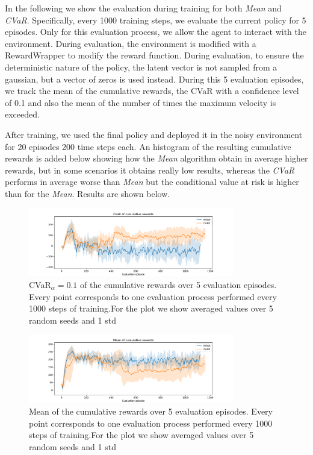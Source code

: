 In the following we show the evaluation during training for both \textit{Mean} and
\textit{CVaR}.
Specifically, every 1000 training steps, we evaluate the current policy for 5 episodes.
Only for this evaluation process, we allow the agent to interact with the environment.
During evaluation, the environment is modified with a RewardWrapper to modify
the reward function.
During evaluation, to ensure the deterministic nature of the policy, 
the latent vector is not sampled from a gaussian, but a vector of zeros is used instead.
During this 5 evaluation episodes, we track the mean of the cumulative rewards,
the CVaR with a confidence level of 0.1 and also the mean of the number of times the 
maximum velocity is exceeded.

After training, we used the final policy and deployed it in the noisy environment for 20 episodes 
200 time steps each. An histogram of the resulting cumulative rewards is added below showing
how the \textit{Mean} algorithm obtain in average higher rewards, but in some scenarios it 
obtains really low results, whereas the \textit{CVaR} performs in average worse than \textit{Mean} 
but the conditional value at risk is higher than for the \textit{Mean}.
Results are shown below.




\begin{figure}[ht]
        \centering
        \includegraphics[width=0.8\textwidth]{images/Cheetah_offpolicy_medium/cvar_train_withstds.pdf}
        \caption{CVaR$_\alpha=0.1$ of the cumulative rewards over 5 evaluation episodes.
        Every point corresponds to one evaluation process performed every 1000 steps of training.For the plot we
        show averaged values over 5 random seeds and 1 std}
        \label{cvar_cheetah}
    
\end{figure}

\begin{figure}[ht]
    \centering
    \includegraphics[width=0.8\textwidth]{images/Cheetah_offpolicy_medium/mean_train_withstds.pdf}
    \caption{Mean of the cumulative rewards over 5 evaluation episodes. Every point corresponds
    to one evaluation process performed every 1000 steps of training.For the plot we
    show averaged values over 5 random seeds and 1 std}
    \label{mean_cheetah}

\end{figure}



